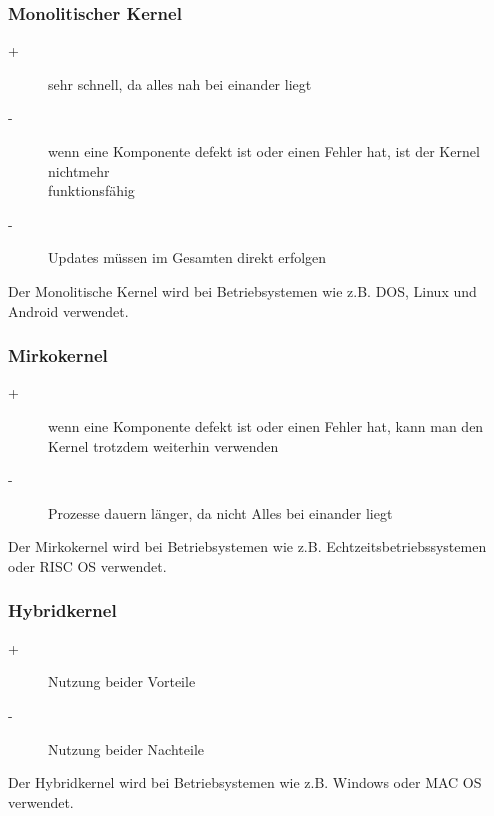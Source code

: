 \documentclass[12pt,a4paper]{article}
\begin{document}
\subsubsection{Monolitischer Kernel}
	\begin{description}
    	\item[+]{sehr schnell, da alles nah bei einander liegt}
    	\item[-]{wenn eine Komponente defekt ist oder einen Fehler hat, ist der Kernel nichtmehr \\ funktionsfähig}
    	\item[-]{Updates müssen im Gesamten direkt erfolgen}
	\end{description}
Der Monolitische Kernel wird bei Betriebsystemen wie z.B. DOS, Linux und Android verwendet.

\subsubsection{Mirkokernel}
	\begin{description}
    	\item[+]{wenn eine Komponente defekt ist oder einen Fehler hat, kann man den Kernel trotzdem weiterhin 							 verwenden}
    	\item[-]{Prozesse dauern länger, da nicht Alles bei einander liegt}
	\end{description}
Der Mirkokernel wird bei Betriebsystemen wie z.B. Echtzeitsbetriebssystemen oder RISC OS verwendet.

\subsubsection{Hybridkernel}
	\begin{description}
    	\item[+]{Nutzung beider Vorteile}
    	\item[-]{Nutzung beider Nachteile}
	\end{description}
Der Hybridkernel wird bei Betriebsystemen wie z.B. Windows oder MAC OS verwendet.
\end{document}

